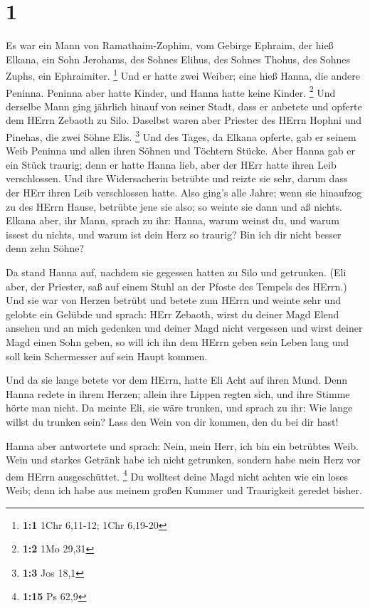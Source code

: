 \hypertarget{section}{%
\section{1}\label{section}}

 Es war ein Mann von Ramathaim-Zophim, vom Gebirge Ephraim,
der hieß Elkana, ein Sohn Jerohams, des Sohnes Elihus, des Sohnes
Thohus, des Sohnes Zuphs, ein Ephraimiter. \footnote{\textbf{1:1} 1Chr
  6,11-12; 1Chr 6,19-20}  Und er hatte zwei Weiber; eine
hieß Hanna, die andere Peninna. Peninna aber hatte Kinder, und Hanna
hatte keine Kinder. \footnote{\textbf{1:2} 1Mo 29,31}  Und
derselbe Mann ging jährlich hinauf von seiner Stadt, dass er anbetete
und opferte dem HErrn Zebaoth zu Silo. Daselbst waren aber Priester des
HErrn Hophni und Pinehas, die zwei Söhne Elis. \footnote{\textbf{1:3}
  Jos 18,1}  Und des Tages, da Elkana opferte, gab er seinem
Weib Peninna und allen ihren Söhnen und Töchtern Stücke. 
Aber Hanna gab er ein Stück traurig; denn er hatte Hanna lieb, aber der
HErr hatte ihren Leib verschlossen.  Und ihre Widersacherin
betrübte und reizte sie sehr, darum dass der HErr ihren Leib
verschlossen hatte.  Also ging's alle Jahre; wenn sie
hinaufzog zu des HErrn Hause, betrübte jene sie also; so weinte sie dann
und aß nichts.  Elkana aber, ihr Mann, sprach zu ihr: Hanna,
warum weinst du, und warum issest du nichts, und warum ist dein Herz so
traurig? Bin ich dir nicht besser denn zehn Söhne?

 Da stand Hanna auf, nachdem sie gegessen hatten zu Silo und
getrunken. (Eli aber, der Priester, saß auf einem Stuhl an der Pfoste
des Tempels des HErrn.)  Und sie war von Herzen betrübt und
betete zum HErrn und weinte sehr  und gelobte ein Gelübde
und sprach: HErr Zebaoth, wirst du deiner Magd Elend ansehen und an mich
gedenken und deiner Magd nicht vergessen und wirst deiner Magd einen
Sohn geben, so will ich ihn dem HErrn geben sein Leben lang und soll
kein Schermesser auf sein Haupt kommen.

 Und da sie lange betete vor dem HErrn, hatte Eli Acht auf
ihren Mund.  Denn Hanna redete in ihrem Herzen; allein ihre
Lippen regten sich, und ihre Stimme hörte man nicht. Da meinte Eli, sie
wäre trunken,  und sprach zu ihr: Wie lange willst du
trunken sein? Lass den Wein von dir kommen, den du bei dir hast!

 Hanna aber antwortete und sprach: Nein, mein Herr, ich bin
ein betrübtes Weib. Wein und starkes Getränk habe ich nicht getrunken,
sondern habe mein Herz vor dem HErrn ausgeschüttet. \footnote{\textbf{1:15}
  Ps 62,9}  Du wolltest deine Magd nicht achten wie ein
loses Weib; denn ich habe aus meinem großen Kummer und Traurigkeit
geredet bisher.

